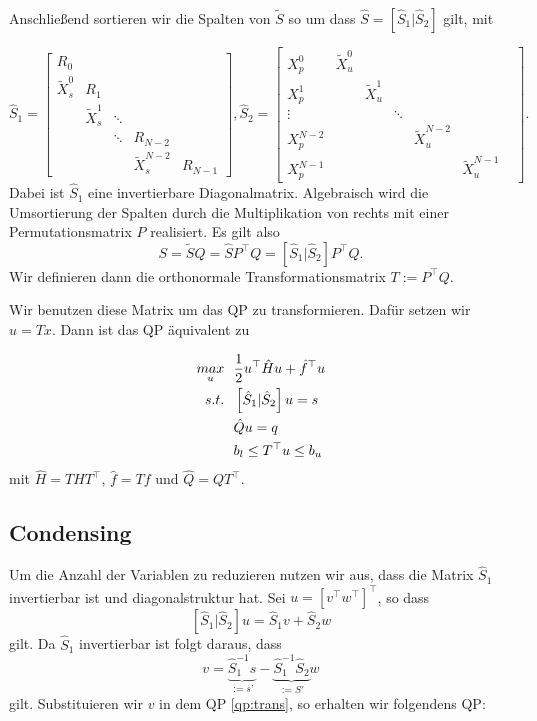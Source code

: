 Anschließend sortieren wir die Spalten von $\tilde{S}$ so um dass $\hat{S}=\left[\hat{S}_1 \vert \hat{S}_2 \right]$ gilt, mit

$$\hat{S}_1=\left[\begin{array}{ccccccc}
R_0 &  &  &  &      \\
\tilde{X}_s^0 & R_1   &  &  &   \\
 & \tilde{X}^1_s  & \ddots &  & \\
   &  &   \ddots & R_{N-2} &   \\
 &  &    & \tilde{X}^{N-2}_s & R_{N-1}    
\end{array} \right],
\hat{S}_2=
\left[ \begin{array}{ccccccc}
X_p^0 & \tilde{X}^0_u &  &  &  & &  \\ 
 X_p^1 &  & \tilde{X}^1_u &  &    &  \\ 
 \vdots &  &    & \ddots &    \\ 
 X_p^{N-2} &    &  &  & \tilde{X}^{N-2}_u &  \\ 
 X_p^{N-1} &    &  &  &  & \tilde{X}^{N-1}_u
\end{array} \right].
$$
Dabei ist $\hat{S}_1$ eine invertierbare Diagonalmatrix. Algebraisch wird die Umsortierung der Spalten durch die Multiplikation von rechts mit einer Permutationsmatrix $P$ realisiert. Es gilt also 
$$S=\tilde{S}Q=\hat{S}P^\top Q=\left[\hat{S}_1 \vert \hat{S}_2 \right]P^\top Q.$$ Wir definieren dann die orthonormale Transformationsmatrix $T:=P^\top Q$.

Wir benutzen diese Matrix um das QP zu transformieren. Dafür setzen wir $u=Tx$. Dann ist das QP äquivalent zu 

\begin{align} \label{qp:trans}
\underset{u}{max} \ \ 	& \frac{1}{2}	u^\top \hat{H} u+\hat{f}^\top u \\
s.t. \ \ 				& \left[\hat{S}_1 \vert \hat{S}_2 \right]u=s \notag \\
						& \hat{Q} u =q \notag \\
						& b_l \leq T^\top u \leq b_u  \notag
\end{align}
mit $\hat{H}=T H T^\top$, $\hat{f}=Tf$ und $\hat{Q}=QT^\top$.


\subsection{Condensing}

Um die Anzahl der Variablen zu reduzieren nutzen wir aus, dass die Matrix $\hat{S}_1$ invertierbar ist und diagonalstruktur hat. Sei $u=[v^\top w^\top]^\top$, so dass $$\left[\hat{S}_1 \vert \hat{S}_2 \right]u=\hat{S}_1v+\hat{S}_2w$$ gilt. Da $\hat{S}_1$ invertierbar ist folgt daraus, dass $$v=\underbrace{\hat{S}^{-1}_1s}_{:=s’}-\underbrace{\hat{S}^{-1}_1\hat{S}_2}_{:=S'} w$$ gilt. Substituieren wir $v$ in dem QP \ref{qp:trans}, so erhalten wir folgendens QP:

